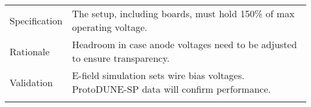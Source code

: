 \begin{table}[htp]
\begin{tabular}{p{}p{}}
    Specification &  The setup, including boards, must hold 150\% of max operating voltage. \\   \colhline
    
    Rationale &  { Headroom in case anode voltages need to be adjusted to ensure transparency. } \\ \colhline
    Validation &{ E-field simulation sets wire bias voltages. ProtoDUNE-SP data will confirm performance. } \\    
   \colhline
   \end{tabular}
  \label{tab:spectable:SP-APA}
\end{table}